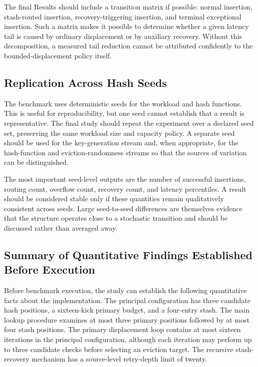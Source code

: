 \documentclass[conference]{IEEEtran}
\begin{document}
The final Results should include a transition matrix if possible: normal insertion, stash-routed insertion, recovery-triggering insertion, and terminal exceptional insertion. Such a matrix makes it possible to determine whether a given latency tail is caused by ordinary displacement or by auxiliary recovery. Without this decomposition, a measured tail reduction cannot be attributed confidently to the bounded-displacement policy itself.

\subsection{Replication Across Hash Seeds}
\label{subsec:seed_replication}

The benchmark uses deterministic seeds for the workload and hash functions. This is useful for reproducibility, but one seed cannot establish that a result is representative. The final study should repeat the experiment over a declared seed set, preserving the same workload size and capacity policy. A separate seed should be used for the key-generation stream and, when appropriate, for the hash-function and eviction-randomness streams so that the sources of variation can be distinguished.

The most important seed-level outputs are the number of successful insertions, routing count, overflow count, recovery count, and latency percentiles. A result should be considered stable only if these quantities remain qualitatively consistent across seeds. Large seed-to-seed differences are themselves evidence that the structure operates close to a stochastic transition and should be discussed rather than averaged away.

\subsection{Summary of Quantitative Findings Established Before Execution}
\label{subsec:preexecution_summary}

Before benchmark execution, the study can establish the following quantitative facts about the implementation. The principal configuration has three candidate hash positions, a sixteen-kick primary budget, and a four-entry stash. The main lookup procedure examines at most three primary positions followed by at most four stash positions. The primary displacement loop contains at most sixteen iterations in the principal configuration, although each iteration may perform up to three candidate checks before selecting an eviction target. The recursive stash-recovery mechanism has a source-level retry-depth limit of twenty.
\end{document}
